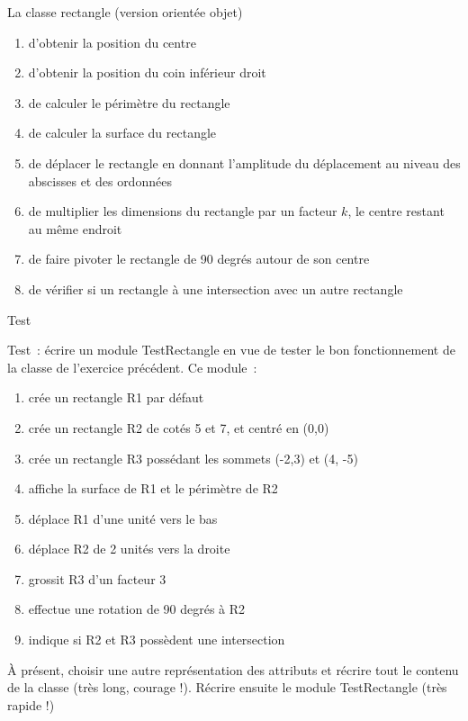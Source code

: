 \begin{Exercice}{La classe rectangle (version orientée objet)}
	\begin{enumerate}[label=\alph*)]
		\item 
			d’obtenir la position du centre
		\item 
			d’obtenir la position du coin inférieur droit
		\item 
			de calculer le périmètre du rectangle
		\item 
			de calculer la surface du rectangle
		\item 
			de déplacer le rectangle en donnant l’amplitude du déplacement au niveau
			des abscisses et des ordonnées
		\item 
			de multiplier les dimensions du rectangle par un facteur $k$, le centre
			restant au même endroit
		\item 
			de faire pivoter le rectangle de 90 degrés autour de son centre
		\item 
			de vérifier si un rectangle à une intersection avec un autre rectangle
	\end{enumerate}
	
\end{Exercice}

\begin{Exercice}{Test}

	Test~: écrire un module TestRectangle en vue de tester le bon
	fonctionnement de la classe  de l'exercice précédent. Ce module~: 

	\begin{enumerate}[label=\alph*)]
		\item 
			crée un rectangle R1 par défaut
		\item 
			crée un rectangle R2 de cotés 5 et 7, et centré en (0,0)
		\item 
			crée un rectangle R3 possédant les sommets (-2,3) et (4, -5)
		\item 
			affiche la surface de R1 et le périmètre de R2
		\item 
			déplace R1 d’une unité vers le bas
		\item 
			déplace R2 de 2 unités vers la droite
		\item 
			grossit R3 d’un facteur 3
		\item 
			effectue une rotation de 90 degrés à R2
		\item 
			indique si R2 et R3 possèdent une intersection
	\end{enumerate}

	À présent, choisir une autre représentation des attributs et récrire
	tout le contenu de la classe (très long, courage !).
	Récrire ensuite le
	module TestRectangle (très rapide !)
\end{Exercice}
